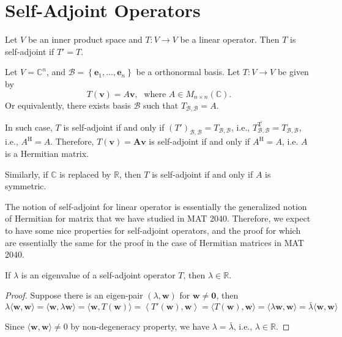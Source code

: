 \section{Self-Adjoint Operators}
\begin{definition}
Let \(V\) be an inner product space and \(T : V \rightarrow  V\) be a linear operator. Then \(T\) is self-adjoint if \(T' = T\).
\end{definition}

\begin{example} \label{eg: self_adjoint_matrix_transformation}
Let \(V = {\mathbb{C}}^{n}\), and \(\mathcal{B} = \left\{  {{\mathbf{e}}_{1},\ldots,{\mathbf{e}}_{n}}\right\}\) be a orthonormal basis. Let \(T : V \rightarrow  V\) be given by
\[
T\left( \mathbf{v}\right)  = A\mathbf{v},\;\text{ where }A \in  {M}_{n \times  n}\left( \mathbb{C}\right).
\]
Or equivalently, there exists basis \(\mathcal{B}\) such that \(T_{\mathcal{B},\mathcal{B}} = A\).

In such case, \(T\) is self-adjoint if and only if \({\left( T'\right) }_{\mathcal{B},\mathcal{B}} = T_{\mathcal{B},\mathcal{B}}\), i.e., \(\overline{T_{\mathcal{B},\mathcal{B}}^{\mathrm{T}}} = T_{\mathcal{B},\mathcal{B}}\), i.e., \({A}^{\mathrm{H}} = A.\)
Therefore, \(T\left( \mathbf{v}\right)  = \mathbf{{Av}}\) is self-adjoint if and only if \({A}^{\mathrm{H}} = A\), i.e. $A$ is a Hermitian matrix.

Similarly, if \(\mathbb{C}\) is replaced by \(\mathbb{R}\), then \(T\) is self-adjoint if and only if \(A\) is symmetric.
\end{example}

The notion of self-adjoint for linear operator is essentially the generalized notion of Hermitian for matrix that we have studied in MAT 2040. Therefore, we expect to have some nice properties for self-adjoint operators, and the proof for which are essentially the same for the proof in the case of Hermitian matrices in MAT 2040.

\begin{proposition}\label{prop: self-adjoint-eigenvalue}
If \(\lambda\) is an eigenvalue of a self-adjoint operator \(T\), then \(\lambda \in \mathbb{R}\).
\end{proposition}

\begin{proof}
Suppose there is an eigen-pair \(\left( {\lambda,\mathbf{w}}\right)\) for \(\mathbf{w} \neq  \mathbf{0}\), then
\[
\lambda \langle \mathbf{w},\mathbf{w}\rangle  = \langle \mathbf{w},\lambda \mathbf{w}\rangle
= \langle \mathbf{w},T\left( \mathbf{w}\right) \rangle  = \left\langle  {T'\left( \mathbf{w}\right),\mathbf{w}}\right\rangle
= \langle T\left( \mathbf{w}\right),\mathbf{w}\rangle  = \langle \lambda \mathbf{w},\mathbf{w}\rangle
= \bar{\lambda }\langle \mathbf{w},\mathbf{w}\rangle
\]

Since \(\langle \mathbf{w},\mathbf{w}\rangle  \neq  0\) by non-degeneracy property, we have \(\lambda  = \bar{\lambda }\), i.e., \(\lambda  \in  \mathbb{R}\).
\end{proof}

